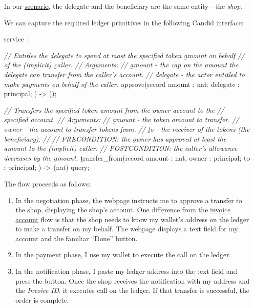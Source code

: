 \documentclass{article}
\begin{document}
In our \href{#payment-scenario}{scenario}, the delegate and the beneficiary are the same entity---the \emph{shop}.

We can capture the required ledger primitives in the following Candid interface:
\begin{code}[candid]
service : {
  \emph{// Entitles the \b{delegate} to spend at most the specified token \b{amount} on behalf}
  \emph{// of the (implicit) \b{caller}.}
  \emph{// Arguments:}
  \emph{//   \b{amount} - the cap on the amount the delegate can transfer from the caller's account.}
  \emph{//   \b{delegate} - the actor entitled to make payments on behalf of the caller.}
  \b{approve}(record {
    amount : nat;
    delegate : principal;
  }) -> ();

  \emph{// Transfers the specified token \b{amount} from the \b{owner} account to the}
  \emph{// specified account.}
  \emph{// Arguments:}
  \emph{//   \b{amount} - the token amount to transfer.}
  \emph{//   \b{owner} - the account to transfer tokens from.}
  \emph{//   \b{to} - the receiver of the tokens (the beneficiary).}
  \emph{//}
  \emph{// PRECONDITION: the \b{owner} has approved at least the \b{amount} to the (implicit) \b{caller}.}
  \emph{// POSTCONDITION: the caller's allowance decreases by the \b{amount}.}
  \b{transfer_from}(record {
    amount : nat;
    owner : principal;
    to : principal;
  }) -> (nat) query;
}
\end{code}

The flow proceeds as follows:
\begin{enumerate}
  \item 
    In the negotiation phase, the webpage instructs me to approve a transfer to the shop, displaying the shop's account.
    One difference from the \href{#invoice-account}{invoice account} flow is that the shop needs to know my wallet's address on the ledger to make a transfer on my behalf.
    The webpage displays a text field for my account and the familiar ``Done'' button.
  \item In the payment phase, I use my wallet to execute the  call on the ledger.
  \item 
    In the notification phase, I paste my ledger address into the text field and press the button.
    Once the shop receives the notification with my address and the \emph{Invoice ID}, it executes  call on the ledger.
    If that transfer is successful, the order is complete.
\end{enumerate}
\end{document}
